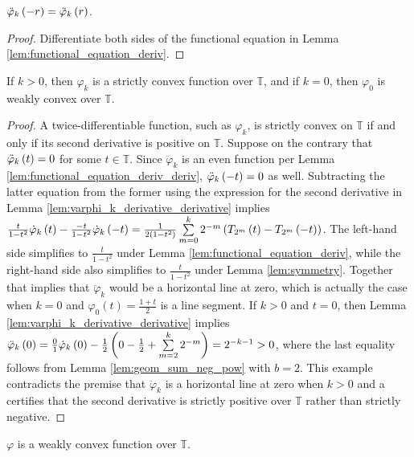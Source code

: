 \begin{lemma}
  \label{lem:functional_equation_deriv_deriv}
  $\ddotvarphi[-r]{k} = \ddotvarphi[r]{k}$.
\end{lemma}
\begin{proof}
  Differentiate both sides of the functional equation in Lemma \ref{lem:functional_equation_deriv}.
\end{proof}

\begin{lemma}
  \label{lem:strictly_convex}
  If $k > 0$, then $\varphi_k$ is a strictly convex function over $\mathbb{T}$, and if $k = 0$, then $\varphi_0$ is weakly convex over $\mathbb{T}$.
\end{lemma}
\begin{proof}
  A twice-differentiable function, such as $\varphi_k$, is strictly convex on $\mathbb{T}$ if and only if its second derivative is positive on $\mathbb{T}$. Suppose on the contrary that $\ddotvarphi[t]{k} = 0$ for some $t \in \mathbb{T}$. Since $\ddot{\varphi}_k$ is an even function per Lemma \ref{lem:functional_equation_deriv_deriv}, $\ddotvarphi[-t]{k} = 0$ as well. Subtracting the latter equation from the former using the expression for the second derivative in Lemma \ref{lem:varphi_k_derivative_derivative} implies $\frac{t}{1 -t^2} \dotvarphi[t]{k} - \frac{-t}{1 - t^2} \dotvarphi[-t]{k} = \frac{1}{2 \left(1 - t^2\right)} \sum\limits_{m = 0}^k 2^{-m} \left(\TT[t]{m} - \TT[-t]{m}\right)$. The left-hand side simplifies to $\frac{t}{1 - t^2}$ under Lemma \ref{lem:functional_equation_deriv}, while the right-hand side also simplifies to $\frac{t}{1 - t^2}$ under Lemma \ref{lem:symmetry}. Together that implies that $\ddot{\varphi}_k$ would be a horizontal line at zero, which is actually the case when $k = 0$ and $\varphi_0\left(t\right) = \frac{1 + t}{2}$ is a line segment. If $k > 0$ and $t = 0$, then Lemma \ref{lem:varphi_k_derivative_derivative} implies $\ddotvarphi[0]{k} = \frac{0}{1} \dotvarphi[0]{k} - \frac{1}{2}\left(0 - \frac{1}{2} + \sum\limits_{m = 2}^k 2^{-m}\right) = 2^{-k - 1} > 0$, where the last equality follows from Lemma \ref{lem:geom_sum_neg_pow} with $b = 2$. This example contradicts the premise that $\ddot{\varphi}_k$ is a horizontal line at zero when $k > 0$ and a certifies that the second derivative is strictly positive  over $\mathbb{T}$ rather than strictly negative.
\end{proof}
\begin{lemma}
  \label{lem:weakly_convex}
  $\varphi$ is a weakly convex function over $\mathbb{T}$.
\end{lemma}
  
